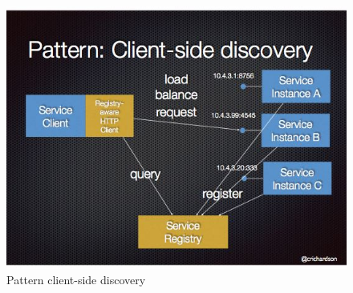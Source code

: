 	\begin{figure}[h]
		\centering
		\includegraphics[width=\textwidth,height=\textheight,keepaspectratio]{images/client-side-discovery.jpg}
		\caption{Pattern client-side discovery}\label{fig:sidediscorig}
	\end{figure}
    \newpage

